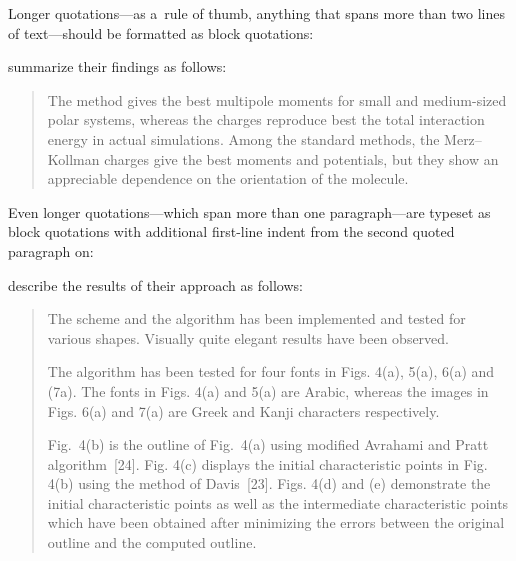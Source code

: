 Longer quotations---as a~rule of thumb, anything that spans more than two lines of text---should be formatted as block quotations:
\begin{longtblr}{}
	\begin{minipage}{\linewidth}%
		\strut\noindent%
		\cite[377]{sigfridsson} summarize their findings as follows:
		\begin{quote}\vspace{-\smallskipamount}%
			The  method gives the best multipole moments for small and medium-sized polar systems, whereas the  charges reproduce best the total interaction energy in actual simulations. Among the standard methods, the Merz--Kollman charges give the best moments and potentials, but they show an appreciable dependence on the orientation of the molecule.%
			\strut
		\end{quote}
	\end{minipage}
\end{longtblr}
\noindent Even longer quotations---which span more than one paragraph---are typeset as block quotations with additional first-line indent from the second quoted paragraph on:
\begin{longtblr}{}
	\begin{minipage}{\linewidth}
		\strut\noindent%
		\cite[801]{sarfraz} describe the results of their approach as follows:
		\begin{quotation}\vspace{-\smallskipamount}%
			The scheme and the algorithm has been implemented and tested for various shapes. Visually quite elegant results have been observed. \par
			The algorithm has been tested for four fonts in Figs. 4(a), 5(a), 6(a) and (7a). The fonts in Figs. 4(a) and 5(a) are Arabic, whereas the images in Figs. 6(a) and 7(a) are Greek and Kanji characters respectively. \par
			Fig.~4(b) is the outline of Fig.~4(a) using modified Avrahami and Pratt algorithm~[24]. Fig. 4(c) displays the initial characteristic points in Fig. 4(b) using the method of Davis~[23]. Figs. 4(d) and (e) demonstrate the initial characteristic points as well as the intermediate characteristic points which have been obtained after minimizing the errors between the original outline and the computed outline.%
			\strut
		\end{quotation}
	\end{minipage}
\end{longtblr}

